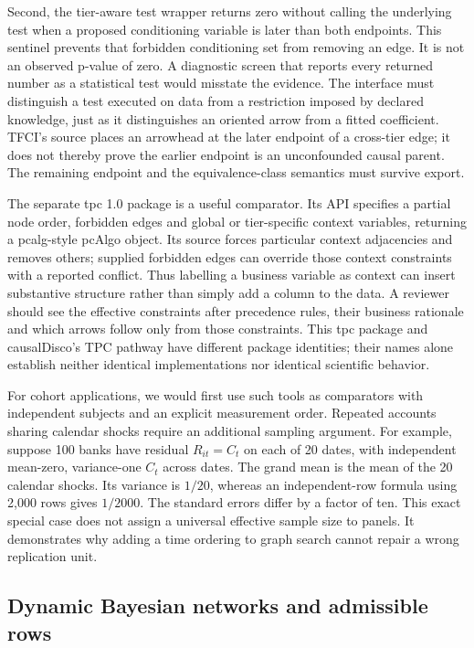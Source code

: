 Second, the tier-aware test wrapper returns zero without calling the underlying
test when a proposed conditioning variable is later than both endpoints. This
sentinel prevents that forbidden conditioning set from removing an edge. It is
not an observed p-value of zero. A diagnostic screen that reports every returned
number as a statistical test would misstate the evidence. The interface must
distinguish a test executed on data from a restriction imposed by declared
knowledge, just as it distinguishes an oriented arrow from a fitted coefficient.
TFCI's source places an arrowhead at the later endpoint of a cross-tier edge;
it does not thereby prove the earlier endpoint is an unconfounded causal parent.
The remaining endpoint and the equivalence-class semantics must survive export.
\citep{exec14_rtime_causaldisco}

The separate tpc 1.0 package is a useful comparator. Its API specifies a partial
node order, forbidden edges and global or tier-specific context variables,
returning a pcalg-style pcAlgo object. Its source forces particular context
adjacencies and removes others; supplied forbidden edges can override those
context constraints with a reported conflict. Thus labelling a business variable
as context can insert substantive structure rather than simply add a column to
the data. A reviewer should see the effective constraints after precedence rules,
their business rationale and which arrows follow only from those constraints.
This tpc package and causalDisco's TPC pathway have different package identities;
their names alone establish neither identical implementations nor identical
scientific behavior. \citep{exec14_rtime_tpc}

For cohort applications, we would first use such tools as comparators with
independent subjects and an explicit measurement order. Repeated accounts sharing
calendar shocks require an additional sampling argument. For example, suppose
100 banks have residual \(R_{it}=C_t\) on each of 20 dates, with independent
mean-zero, variance-one \(C_t\) across dates. The grand mean is the mean of the
20 calendar shocks. Its variance is \(1/20\), whereas an independent-row formula
using 2,000 rows gives \(1/2000\). The standard errors differ by a factor of ten.
This exact special case does not assign a universal effective sample size to
panels. It demonstrates why adding a time ordering to graph search cannot repair
a wrong replication unit. \citep{exec14_rtime_exact}

\subsection{Dynamic Bayesian networks and admissible rows}


